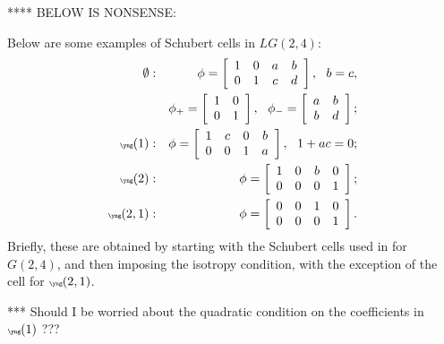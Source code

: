 \documentclass[12pt]{article}
\begin{document}
**** BELOW IS NONSENSE:

Below are some examples of Schubert cells in $LG(2,4)$:
\begin{eqnarray}
\emptyset: & & \phi = \left[ \begin{array}{cccc}1 & 0 & a & b \\
0 & 1 & c & d \end{array} \right], \: \: \: b=c, \\
& & 
\phi_+ = \left[ \begin{array}{cc} 1 & 0 \\ 0 & 1 \end{array} \right],
\: \: \:
\phi_- = \left[ \begin{array}{cc} a & b \\ b & d \end{array} \right];
\\
\tiny\yng(1): & & \phi = \left[ \begin{array}{cccc} 1 & c & 0 & b \\
0 & 0 & 1 & a \end{array} \right], \: \: \: 1 + ac = 0;
\\
\tiny\yng(2): & & \phi = \left[ \begin{array}{cccc} 1 & 0 & b & 0 \\
0 & 0 & 0 & 1 \end{array} \right];
\\
\tiny\yng(2,1): & & \phi = \left[ \begin{array}{cccc} 0 & 0 & 1 & 0 \\
0 & 0 & 0 & 1 \end{array} \right].
\end{eqnarray}
Briefly, these are obtained by starting with the Schubert cells used
in \cite{Closset:2023bdr} for $G(2,4)$, and then imposing the isotropy
condition, with the exception of the cell for $\tiny\yng(2,1)$.

*** Should I be worried about the quadratic condition on the coefficients
in $\tiny\yng(1)$ ???
\end{document}
